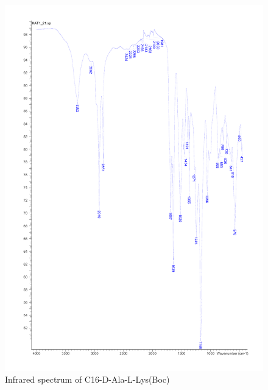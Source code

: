 \begin{figure}[ht!]
\centering
\includegraphics[scale=0.6]{IR/KAT1_21.pdf}
\caption{Infrared spectrum of C16-D-Ala-L-Lys(Boc)}
\end{figure}

